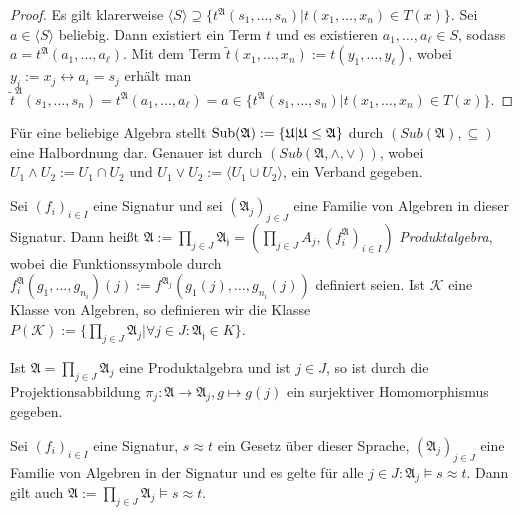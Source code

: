 \begin{proof}
    Es gilt klarerweise $\langle S\rangle\supseteq \{t^\mathfrak{A}(s_1,\ldots,s_n)\vert t(x_1,\ldots,x_n)\in T(x)\}$.
    Sei $a\in\langle S\rangle$ beliebig. Dann existiert ein Term $t$ und es existieren $a_1,\ldots,a_\ell\in S$,
    sodass $a=t^\mathfrak{A}(a_1,\ldots,a_\ell)$. Mit dem Term $\tilde{t}(x_1,\ldots,x_n):=t(y_1,\ldots,y_\ell)$, wobei $y_i:=x_j\leftrightarrow a_i=s_j$
    erhält man $\tilde{t}^\mathfrak{A}(s_1,\ldots,s_n)=t^\mathfrak{A}(a_1,\ldots,a_\ell)=a\in\{t^\mathfrak{A}(s_1,\ldots,s_n)\vert t(x_1,\ldots,x_n)\in T(x)\}.$
\end{proof}

\begin{remark}
    Für eine beliebige Algebra stellt $\operatorname{Sub}(\mathfrak{A}):=\{\mathfrak{U}\vert \mathfrak{U}\le \mathfrak{A}\}$ durch
    $(Sub(\mathfrak{A}),\subseteq)$ eine Halbordnung dar. Genauer ist durch $(Sub(\mathfrak{A},\land,\lor))$,
    wobei $U_1\land U_2:=U_1\cap U_2$ und $U_1\lor U_2:=\langle U_1\cup U_2\rangle$, ein Verband gegeben.
\end{remark}

\begin{definition}
    Sei $(f_i)_{i\in I}$ eine Signatur und sei $(\mathfrak{A}_j)_{j\in J}$ eine Familie von Algebren in dieser Signatur.
    Dann heißt $\mathfrak{A}:=\prod_{j\in J}\mathfrak{A_j}=(\prod_{j\in J}A_j,(f^\mathfrak{A}_i)_{i\in I})$ \emph{Produktalgebra},
    wobei die Funktionssymbole durch $f^\mathfrak{A}_i(g_1,\ldots,g_{n_i})(j):=f^{\mathfrak{A}_j}(g_1(j),\ldots,g_{n_i}(j))$
    definiert seien. Ist $\mathcal{K}$ eine Klasse von Algebren, so definieren wir die Klasse $P(\mathcal{K}):=\{\prod_{j\in J}\mathfrak{A}_j\vert \forall j\in J:\mathfrak{A_j}\in K\}$.
\end{definition}

\begin{remark}
    Ist $\mathfrak{A}=\prod_{j\in J}\mathfrak{A}_j$ eine Produktalgebra und ist $j\in J$, so ist durch die Projektionsabbildung
    $\pi_j:\mathfrak{A}\to \mathfrak{A}_j, g\mapsto g(j)$ ein surjektiver Homomorphismus gegeben.
\end{remark}

\begin{proposition}
    Sei $(f_i)_{i\in I}$ eine Signatur, $s\approx t$ ein Gesetz über dieser Sprache, $(\mathfrak{A}_j)_{j\in J}$
    eine Familie von Algebren in der Signatur und es gelte für alle $j\in J:\mathfrak{A}_j\models s\approx t$.
    Dann gilt auch $\mathfrak{A}:=\prod_{j\in J}\mathfrak{A}_j\models s\approx t$.
\end{proposition}

